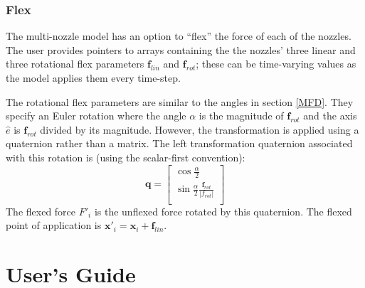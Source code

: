 \documentclass[11pt,fleqn]{report}
\begin{document}
\subsection{Flex}
\par The multi-nozzle model has an option to ``flex'' the force of each of the nozzles. The user provides pointers to arrays containing the the nozzles' three linear and three rotational flex parameters $\mathbf{f}_{lin}$ and $\mathbf{f}_{rot}$; these can be time-varying values as the model applies them every time-step.
\par The rotational flex parameters are similar to the angles in section \ref{MFD}. They specify an Euler rotation where the angle $\alpha$ is the magnitude of $\mathbf{f}_{rot}$ and the axis $\hat{e}$ is $\mathbf{f}_{rot}$ divided by its magnitude. However, the transformation is applied using a quaternion rather than a matrix. The left transformation quaternion associated with this rotation is (using the scalar-first convention):
$$\mathbf{q} = \begin{bmatrix}
\cos\frac{\alpha}{2} \\[1em]
\sin\frac{\alpha}{2}\frac{\mathbf{f}_{rot}}{\left|f_{rot}\right|} \\
\end{bmatrix}$$
The flexed force $F'_i$ is the unflexed force rotated by this quaternion. The flexed point of application is $\mathbf{x}'_i = \mathbf{x}_i + \mathbf{f}_{lin}$.

\chapter{User's Guide}
\end{document}
